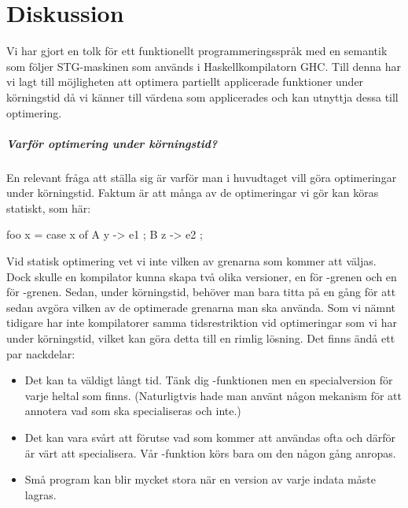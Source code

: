 \documentclass[Rapport]{subfiles}
\begin{document}
\chapter{Diskussion}
    
Vi har gjort en tolk för ett funktionellt programmeringsspråk
med en semantik som följer STG-maskinen som används i Haskellkompilatorn GHC.
Till denna har vi lagt till möjligheten att optimera partiellt applicerade funktioner under körningstid
då vi känner till värdena som applicerades och kan utnyttja dessa till optimering.

\paragraph{Varför optimering under körningstid?}

En relevant fråga att ställa sig är varför man i huvudtaget vill göra optimeringar under körningstid. Faktum är att många av de optimeringar vi gör kan köras statiskt, som här:

\begin{codeEx}

foo x = case x of
        { A y  -> e1
        ; B z  -> e2
        };

\end{codeEx}

Vid statisk optimering vet vi inte vilken av grenarna som kommer att väljas. Dock skulle en kompilator kunna skapa två olika versioner, en för -grenen och en för 
-grenen. Sedan, under körningstid, behöver man bara titta på  en gång för att sedan avgöra vilken av de optimerade grenarna man ska använda.
Som vi nämnt tidigare har inte kompilatorer samma tidsrestriktion vid optimeringar som vi har under körningstid, vilket kan göra detta till en rimlig lösning. Det finns ändå ett par nackdelar:
\begin{itemize}
    \item Det kan ta väldigt långt tid. Tänk dig -funktionen men en specialversion för varje heltal som finns. (Naturligtvis hade man använt någon mekanism för att annotera vad som ska specialiseras och inte.)
    \item Det kan vara svårt att förutse vad som kommer att användas ofta och därför är värt att specialisera. Vår -funktion körs bara om den någon gång anropas.
    \item Små program kan blir mycket stora när en version av varje indata måste lagras.
\end{itemize}
\end{document}
